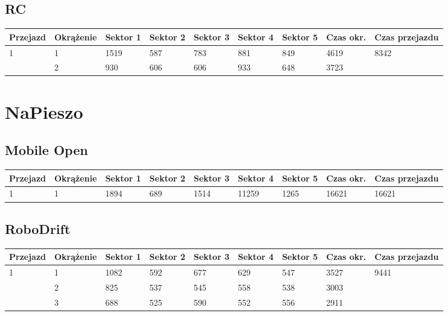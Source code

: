 \documentclass[11pt]{article}
\begin{document}
\subsection{RC}
\begin{table}[h]
\begin{tabular}{|l|l|l|l|l|l|l|l|l|}
\hline
 Przejazd        & Okrążenie & Sektor 1 & Sektor 2 & Sektor 3 & Sektor 4 & Sektor 5 & Czas okr. & Czas przejazdu    \\ \hline
\multirow{2}{*}{1}& 1 &1519& 587& 783& 881& 849& 4619& \multirow{2}{*}{8342} \\ \cline{2-8}
& 2& 930& 606& 606& 933& 648& 3723& \\ \hline
\end{tabular}
\end{table}
\pagebreak
\section{NaPieszo}
\subsection{Mobile Open}
\begin{table}[h]
\begin{tabular}{|l|l|l|l|l|l|l|l|l|}
\hline
   Przejazd        & Okrążenie & Sektor 1 & Sektor 2 & Sektor 3 & Sektor 4 & Sektor 5 & Czas okr. & Czas przejazdu    \\ \hline
\multirow{1}{*}{1}& 1 &1894& 689& 1514& 11259& 1265& 16621& 16621\\ \hline
\end{tabular}
\end{table}
\subsection{RoboDrift}
\begin{table}[h]
\begin{tabular}{|l|l|l|l|l|l|l|l|l|}
\hline
   Przejazd        & Okrążenie & Sektor 1 & Sektor 2 & Sektor 3 & Sektor 4 & Sektor 5 & Czas okr. & Czas przejazdu    \\ \hline
\multirow{3}{*}{1}& 1 &1082& 592& 677& 629& 547& 3527& \multirow{3}{*}{9441} \\ \cline{2-8}
& 2& 825& 537& 545& 558& 538& 3003& \\ \cline{2-8}
& 3& 688& 525& 590& 552& 556& 2911& \\ \hline
\end{tabular}
\end{table}
\end{document}
